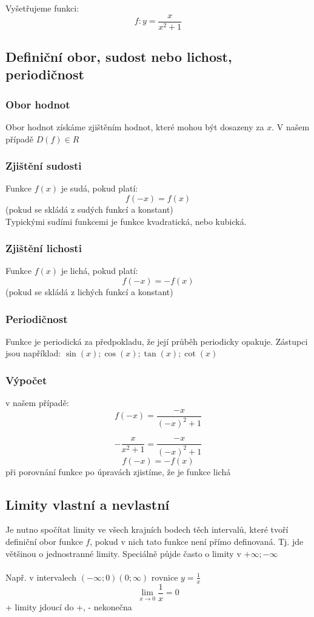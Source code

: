 Vyšetřujeme funkci: 
$$
    f: y=\frac{x}{x^2+1}
$$
\subsection{Definiční obor, sudost nebo lichost, periodičnost}
\subsubsection{Obor hodnot}
Obor hodnot získáme zjištěním hodnot, které mohou být dosazeny za $x$.
V našem případě $D(f) \in R$
\subsubsection{Zjištění sudosti}
Funkce $f(x)$ je sudá, pokud platí:
$$
    f(-x)=f(x)
$$
(pokud se skládá z sudých funkcí a konstant) \\
Typickými sudími funkcemi je funkce kvadratická, nebo kubická.
\subsubsection{Zjištění lichosti}
Funkce $f(x)$ je lichá, pokud platí:
$$
    f(-x)=-f(x)
$$
(pokud se skládá z lichých funkcí a konstant)\\
\subsubsection{Periodičnost}
Funkce je periodická za předpokladu, že její průběh periodicky opakuje. Zástupci jsou například: $\sin(x); \cos(x); \tan(x); \cot(x)$
\subsubsection{Výpočet}
v našem případě:
$$
    f(-x)=\frac{-x}{(-x)^2+1}
$$

$$
    -\frac{x}{x^2+1}=\frac{-x}{(-x)^2+1}
$$
$$
    f(-x)=-f(x)
$$
při porovnání funkce po úpravách zjistíme, že je funkce lichá
\subsection{Limity vlastní a nevlastní}
Je nutno spočítat limity ve všech krajních bodech těch intervalů, které tvoří
definiční obor funkce $f$, pokud v nich tato funkce není přímo definovaná. Tj. jde většinou o jednostranné limity. Speciálně půjde často o limity v $+\infty; -\infty$
\\ \\
Např. v intervalech $(-\infty; 0)(0; \infty)$ rovnice $y=\frac{1}{x}$
$$
    \lim_{x\rightarrow0}{\frac{1}{x}}=0
$$
+ limity jdoucí do +, - nekonečna
